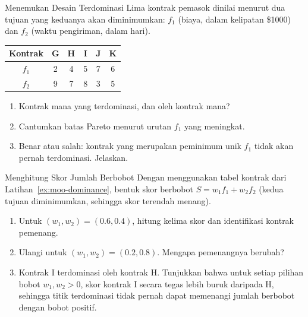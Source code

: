 \begin{ex}{Menemukan Desain Terdominasi}{}
\label{ex:moo-dominance}
Lima kontrak pemasok dinilai menurut dua tujuan yang keduanya akan diminimumkan: $f_1$ (biaya, dalam kelipatan \$1000) dan $f_2$ (waktu pengiriman, dalam hari).

\begin{center}
\begin{tabular}{c|ccccc}
Kontrak & G & H & I & J & K \\\hline
$f_1$    & 2 & 4 & 5 & 7 & 6 \\
$f_2$    & 9 & 7 & 8 & 3 & 5 \\
\end{tabular}
\par{}\label{tab:multi-objective-optimization_updated-tab01}%

\end{center}

\begin{enumerate}
\item Kontrak mana yang terdominasi, dan oleh kontrak mana?
\item Cantumkan batas Pareto menurut urutan $f_1$ yang meningkat.
\item Benar atau salah: kontrak yang merupakan peminimum unik $f_1$ tidak akan pernah terdominasi. Jelaskan.
\end{enumerate}
\end{ex}

\begin{ex}{Menghitung Skor Jumlah Berbobot}{}
\label{ex:moo-weighted-scores}
Dengan menggunakan tabel kontrak dari Latihan~\ref{ex:moo-dominance}, bentuk skor berbobot $S = w_1 f_1 + w_2 f_2$ (kedua tujuan diminimumkan, sehingga skor terendah menang).
\begin{enumerate}
\item Untuk $(w_1, w_2) = (0.6, 0.4)$, hitung kelima skor dan identifikasi kontrak pemenang.
\item Ulangi untuk $(w_1, w_2) = (0.2, 0.8)$. Mengapa pemenangnya berubah?
\item Kontrak I terdominasi oleh kontrak H. Tunjukkan bahwa untuk setiap pilihan bobot $w_1, w_2 > 0$, skor kontrak I secara tegas lebih buruk daripada H, sehingga titik terdominasi tidak pernah dapat memenangi jumlah berbobot dengan bobot positif.
\end{enumerate}
\end{ex}

